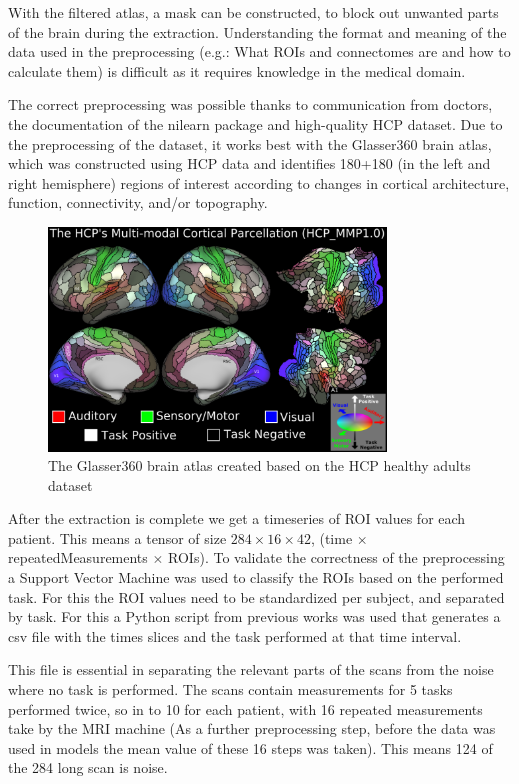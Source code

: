 	With the filtered atlas, a mask can be constructed, to block out unwanted parts of the brain during the extraction. Understanding the format and meaning of the data used in the preprocessing (e.g.: What ROIs and connectomes are and how to calculate them) is difficult as it requires knowledge in the medical domain. 
	
	The correct preprocessing was possible thanks to communication from doctors, the documentation of the nilearn package and high-quality HCP dataset. Due to the preprocessing of the dataset, it works best with the Glasser360 brain atlas\cite{sporns2005human}, which was constructed using HCP data and identifies 180+180 (in the left and right hemisphere) regions of interest according to changes in cortical architecture, function, connectivity, and/or topography.

	\begin{figure}[!h]
		\centering
		\includegraphics[width=0.8\textwidth]{figures/atlas.png}
		\caption{The Glasser360 brain atlas created based on the HCP healthy adults dataset\cite{sporns2005human}}
	\end{figure}

	After the extraction is complete we get a timeseries of ROI values for each patient. This means a tensor of size $284 \times 16 \times 42$, (time $\times$ repeatedMeasurements $\times$ ROIs). To validate the correctness of the preprocessing a Support Vector Machine was used to classify the ROIs based on the performed task. For this the ROI values need to be standardized per subject, and separated by task. For this a Python script from previous works was used that generates a csv file with the times slices and the task performed at that time interval. 
	
	This file is essential in separating the relevant parts of the scans from the noise where no task is performed. The scans contain measurements for 5 tasks performed twice, so in to 10 for
	each patient, with 16 repeated measurements take by the MRI machine (As a further preprocessing step, before the data was used in models the mean value of these 16 steps was taken). This means 124 of the 284 long
	scan is noise.
	

